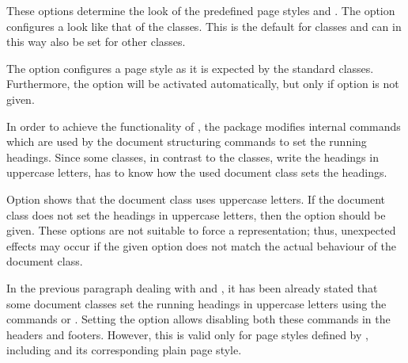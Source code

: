 \begin{Declaration}
\end{Declaration}%
These options determine the look of the predefined page styles
 and . The option
 configures a look like that of the {\KOMAScript} classes.
This is the default for {\KOMAScript} classes and can in this way also be set
for other classes.

The option  configures a page style as it is
expected by the standard classes. Furthermore, the option
 will be activated automatically, but only if
option  is not given.%
\EndIndexGroup


\begin{Declaration}
\end{Declaration}%
In order to achieve the functionality of , the package
 modifies internal commands which are used by the
document structuring commands to set the running headings.  Since some
classes, in contrast to the {\KOMAScript} classes, write the headings
in uppercase letters,  has to know how the used
document class sets the headings.

Option  shows  that the document class
uses uppercase letters.  If the document class does not set the headings in
uppercase letters, then the option  should be given.
These options are not suitable to force a representation;
thus, unexpected effects may occur if the given option does not match the
actual behaviour of the document class.%
\EndIndexGroup


\begin{Declaration}
\end{Declaration}%
In the previous paragraph dealing with  and
, it has been already stated that some document classes
set the running headings in uppercase letters using the
commands
or .
Setting the option  allows disabling both these commands
in the headers and footers.  However, this is valid only for page styles
defined by , including  and its
corresponding plain page style.

